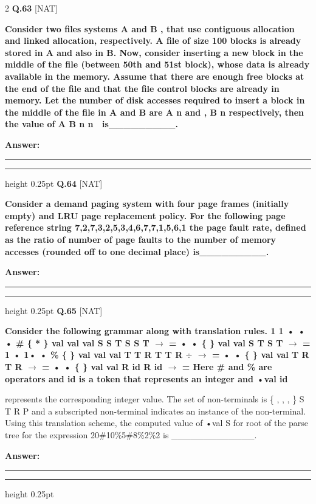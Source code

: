 \documentclass[a4paper,10pt,twoside]{article}
\begin{document}
\begin{multicols}{2}
\noindent\textbf{Q.63} \hfill {\footnotesize\textsf{[NAT]}}
\par\vspace{2pt}
{\bfseries Consider two files systems A and B , that use contiguous allocation and linked
allocation, respectively. A file of size 100 blocks is already stored in A and also in
B. Now, consider inserting a new block in the middle of the file (between 50th and
51st block), whose data is already available in the memory. Assume that there are
enough free blocks at the end of the file and that the file control blocks are already
in memory. Let the number of disk accesses required to insert a block in the middle
of the file in A and B are
A
n and
,
B
n respectively, then the value of
A
B
n
n

is\_\_\_\_\_\_\_\_\_. \par}
\par\vspace{3pt}\noindent\textbf{Answer:} \rule{3.2cm}{0.4pt}
\par\vspace{6pt}\hrule height 0.25pt\vspace{6pt}
\noindent\textbf{Q.64} \hfill {\footnotesize\textsf{[NAT]}}
\par\vspace{2pt}
{\bfseries Consider a demand paging system with four page frames (initially empty) and LRU
page replacement policy. For the following page reference string
7,2,7,3,2,5,3,4,6,7,7,1,5,6,1
the page fault rate, defined as the ratio of number of page faults to the number of
memory accesses (rounded off to one decimal place) is\_\_\_\_\_\_\_\_\_. \par}
\par\vspace{3pt}\noindent\textbf{Answer:} \rule{3.2cm}{0.4pt}
\par\vspace{6pt}\hrule height 0.25pt\vspace{6pt}
\noindent\textbf{Q.65} \hfill {\footnotesize\textsf{[NAT]}}
\par\vspace{2pt}
{\bfseries Consider the following grammar along with translation rules.
1
1
•
•
•
\#
\{
*
\}
val
val
val
S
S
T
S
S
T
$\to$
=
•
•
\{
\}
val
val
S
T
S
T
$\to$
=
1
•
1•
•
\%
\{
\}
val
val
val
T
T
R
T
T
R
$\div$
$\to$
=
•
•
\{
\}
val
val
T
R
T
R
$\to$
=
•
•
\{
\}
val
val
R
id
R
id
$\to$
=
Here \# and \% are operators and id is a token that represents an integer and
•val
id
\par\smallskip
represents the corresponding integer value. The set of non-terminals is \{ , ,
, \}
S T R P
and a subscripted non-terminal indicates an instance of the non-terminal.
Using this translation scheme, the computed value of
•val
S
for root of the parse tree
for the expression 20\#10\%5\#8\%2\%2 is \_\_\_\_\_\_\_\_\_\_\_\_\_. \par}
\par\vspace{3pt}\noindent\textbf{Answer:} \rule{3.2cm}{0.4pt}
\par\vspace{6pt}\hrule height 0.25pt\vspace{6pt}
\end{multicols}
\end{document}
